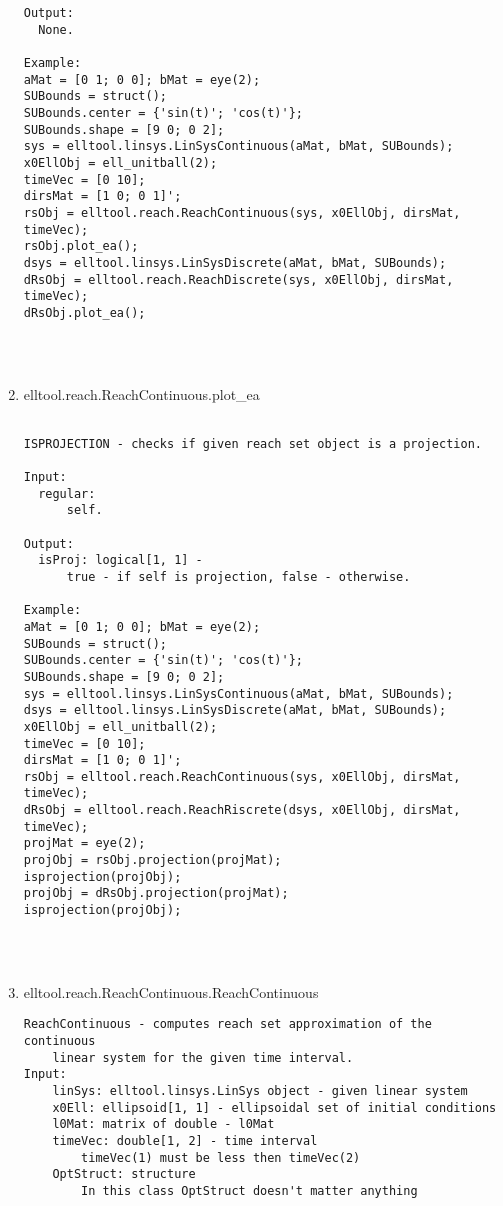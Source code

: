 \begin{enumerate}
\begin{lstlisting}
Output:
  None.

Example:
aMat = [0 1; 0 0]; bMat = eye(2);
SUBounds = struct();
SUBounds.center = {'sin(t)'; 'cos(t)'};
SUBounds.shape = [9 0; 0 2];
sys = elltool.linsys.LinSysContinuous(aMat, bMat, SUBounds);
x0EllObj = ell_unitball(2);
timeVec = [0 10];
dirsMat = [1 0; 0 1]';
rsObj = elltool.reach.ReachContinuous(sys, x0EllObj, dirsMat, timeVec);
rsObj.plot_ea();
dsys = elltool.linsys.LinSysDiscrete(aMat, bMat, SUBounds);
dRsObj = elltool.reach.ReachDiscrete(sys, x0EllObj, dirsMat, timeVec);
dRsObj.plot_ea();




\end{lstlisting}
\fontfamily{\familydefault}
\selectfont
\item {elltool.reach.ReachContinuous.plot\_ea}
\selectfont
\begin{lstlisting}

ISPROJECTION - checks if given reach set object is a projection.

Input:
  regular:
      self.

Output:
  isProj: logical[1, 1] -
      true - if self is projection, false - otherwise.

Example:
aMat = [0 1; 0 0]; bMat = eye(2);
SUBounds = struct();
SUBounds.center = {'sin(t)'; 'cos(t)'};
SUBounds.shape = [9 0; 0 2];
sys = elltool.linsys.LinSysContinuous(aMat, bMat, SUBounds);
dsys = elltool.linsys.LinSysDiscrete(aMat, bMat, SUBounds);
x0EllObj = ell_unitball(2);
timeVec = [0 10];
dirsMat = [1 0; 0 1]';
rsObj = elltool.reach.ReachContinuous(sys, x0EllObj, dirsMat, timeVec);
dRsObj = elltool.reach.ReachRiscrete(dsys, x0EllObj, dirsMat, timeVec);
projMat = eye(2);
projObj = rsObj.projection(projMat);
isprojection(projObj);
projObj = dRsObj.projection(projMat);
isprojection(projObj);




\end{lstlisting}
\fontfamily{\familydefault}
\selectfont
\item {elltool.reach.ReachContinuous.ReachContinuous}
\selectfont
\begin{lstlisting}
ReachContinuous - computes reach set approximation of the continuous
    linear system for the given time interval.
Input:
    linSys: elltool.linsys.LinSys object - given linear system
    x0Ell: ellipsoid[1, 1] - ellipsoidal set of initial conditions
    l0Mat: matrix of double - l0Mat
    timeVec: double[1, 2] - time interval
        timeVec(1) must be less then timeVec(2)
    OptStruct: structure
        In this class OptStruct doesn't matter anything


\end{lstlisting}
\end{enumerate}
